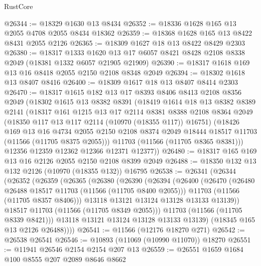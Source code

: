 \begin{lexlean}{RustCore}
\begin{coremodule}
@26344 := @18329 @1630 @13 @8434
@26352 := @18336 @1628 @165 @13 @2055 @4708 @2055 @8434 @18362
@26359 := @18368 @1628 @165 @13 @8422 @8431 @2055 @2126
@26365 := @18309 @1627 @18 @13 @8422 @8429 @2303
@26380 := @18317
    @1333
    @1620
    @13
    @17
    @6057
    @8421
    @8428
    @2108
    @8338
    @2049
    (@18381 @1332 @6057 @21905 @21909)
@26390 := @18317 @1618 @169 @13 @16 @8418 @2055 @2150 @2108 @8348 @2049
@26394 := @18302 @1618 @13 @8407 @8416
@26400 := @18309 @1617 @18 @13 @8407 @8414 @2303
@26470 := @18317
    @1615
    @182
    @13
    @17
    @8393
    @8406
    @8413
    @2108
    @8356
    @2049
    (@18302
      @1615
      @13
      @8382
      @8391
      (@18419
        @1614
        @18
        @13
        @8382
        @8389
        @2141
        (@18317
          @161
          @1215
          @13
          @17
          @2114
          @8381
          @8388
          @2108
          @8364
          @2049
          (@18350 @117 @13 @117 @2114 (@10970 (@18355 @117)) @16751)
          (@18426
            @169
            @13
            @16
            @4734
            @2055
            @2150
            @2108
            @8374
            @2049
            @18444
            @18517
            @11703
            (@11566 (@11705 @8375 @2055)))
          @11703
          (@11566 (@11705 @8365 @8381)))
        @12356
        @12359
        @12362
        @12366
        @12371
        @12377))
@26480 := @18317 @165 @169 @13 @16 @2126 @2055 @2150 @2108 @8399 @2049
@26488 := @18350 @132 @13 @132 @2126 (@10970 (@18355 @132)) @16795
@26538 := @26341
    (@26344
      (@26352
        (@26359
          (@26365
            (@26380
              (@26390
                (@26394
                  (@26400
                    (@26470
                      (@26480 @26488 @18517 @11703 (@11566 (@11705 @8400 @2055)))
                      @11703
                      (@11566 (@11705 @8357 @8406)))
                    @13118
                    @13121
                    @13124
                    @13128
                    @13133
                    @13139))
                @18517
                @11703
                (@11566 (@11705 @8349 @2055)))
              @11703
              (@11566 (@11705 @8339 @8421)))
            @13118
            @13121
            @13124
            @13128
            @13133
            @13139)
          (@18345 @165 @13 @2126 @26488))))
@26541 := @11566 (@12176 @18270 @271)
@26542 := @26538 @26541
@26546 := @10893 (@11069 (@10990 @11070)) @18270
@26551 := @11941 @26546 @2154 @2154 @207 @13
@26559 := @26551 @1659 @1684 @100 @8555 @207 @2089 @8646 @8662

\end{coremodule}
\end{lexlean}
